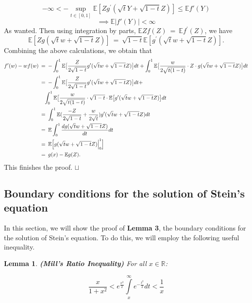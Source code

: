 \documentclass[12pt]{article}
\newcommand{\e}{\mathbb{E}}
\newcommand\qed{\hfill\hbox{\rlap{$\sqcap$}$\sqcup$}}
\newcommand{\eq }{\: = \:}
\newtheorem{lemma}{Lemma}
\theoremstyle{nonumberplain}
\begin{document}
$$
-\infty < - \sup \limits_{t \in [0, 1]} \e  [Zg^{\prime}(\sqrt{t}Y+\sqrt{1-t}Z)] \le \e f'(Y)
$$
$$
\implies \e |f'(Y)| < \infty
$$
As wanted. Then using integration by parts, $\mathbb{E}Zf(Z)\eq \mathbb{E}f^{\prime}(Z)$, we have
$$
\mathbb{E}[Zg(\sqrt{t}w+\sqrt{1-t}Z)]\eq \sqrt{1-t}\mathbb{E}[g^{\prime}(\sqrt{t}w+\sqrt{1-t}Z)].
$$
Combining the above calculations, we obtain that
\begin{align*}
f^{\prime}(w)-wf(w)&\eq -\int_{0}^{1} \mathbb{E}\bigl[\frac{Z}{2\sqrt{1-t}}g^{\prime}(\sqrt{t}w+\sqrt{1-t}Z) \bigr]dt+\int_{0}^{1} \mathbb{E}\bigl[\frac{w}{2\sqrt{t(1-t)}}\cdot Z\cdot g(\sqrt{t}w+\sqrt{1-t}Z) \bigr]dt \\
&\eq -\int_{0}^{1} \mathbb{E}\bigl[\frac{Z}{2\sqrt{1-t}}g^{\prime}(\sqrt{t}w+\sqrt{1-t}Z) \bigr]dt+\\
&\quad  \int_{0}^{1} \mathbb{E}\bigl[\frac{w}{2\sqrt{t(1-t)}}\cdot \sqrt{1-t} \cdot \mathbb{E}\bigl[g^{\prime}(\sqrt{t}w+\sqrt{1-t}Z) \bigr]dt\\
&\eq \int_{0}^{1} \mathbb{E}(\frac{-Z}{2\sqrt{1-t}}+\frac{w}{2\sqrt{t}})g^{\prime}(\sqrt{t}w+\sqrt{1-t}Z)dt\\
&\eq \mathbb{E}\int_{0}^{1} \frac{dg(\sqrt{t}w+\sqrt{1-t}Z)}{dt}dt\\
&\eq \mathbb{E}\Bigl[g(\sqrt{t}w+\sqrt{1-t}Z)\Bigl|_{0}^{1} \Bigr]\\
&\eq g(x)-\mathbb{E}g(Z).
\end{align*}
This finishes the proof.
\qed


\subsection{Boundary conditions for the solution of Stein's equation}

In this section, we will show the proof of \textbf{Lemma 3}, the boundary conditions for the solution of Stein's equation. To do this, we will employ the following useful inequality.

\begin{lemma} \textbf{(Mill's Ratio Inequality)}
For all $x \in \mathbb{R}$:

\begin{equation}
    \frac{x}{1 + x^2} < e ^{\frac{x^2}{2}} \int \limits_{x}^{\infty} e^ {- \frac{t^2}{2}}dt < \frac{1}{x}
\end{equation}
\end{lemma}
\end{document}
